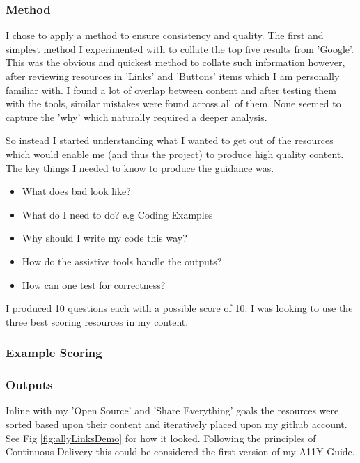 \subsubsection{Method}
I chose to apply a method to ensure consistency and quality. The first and
simplest method I experimented with to collate the top five results from
'Google'. This was the obvious and quickest method to collate such information
however, after reviewing resources in 'Links' and 'Buttons' items which I am
personally familiar with. I found a lot of overlap between content and after
testing them with the tools, similar mistakes were found across all of them.
None seemed to capture the 'why' which naturally required a deeper analysis.

So instead I started understanding what I wanted to get out of the resources
which would enable me (and thus the project) to produce high quality content.
The key things I needed to know to produce the guidance was.

\begin {itemize}
\item What does bad look like?
\item What do I need to do? e.g Coding Examples
\item Why should I write my code this way?
\item How do the assistive tools handle the outputs?
\item How can one test for correctness?
\end{itemize}

I produced 10 questions each with a possible score of 10. I was looking to
use the three best scoring resources in my content.

\subsubsection{Example Scoring}


\subsubsection{Outputs}
Inline with my 'Open Source' and 'Share Everything' goals the resources were
sorted based upon their content and iteratively placed upon my github account.
See Fig \ref{fig:allyLinksDemo} for how it looked.
Following the principles of Continuous Delivery this could be considered the
first version of my A11Y Guide.

